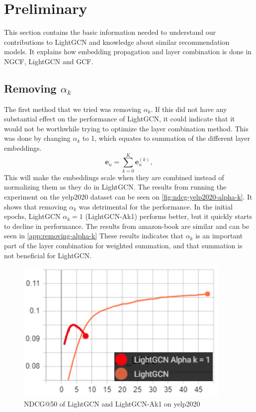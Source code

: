 \section{Preliminary}
This section contains the basic information needed to understand our contributions to LightGCN and knowledge about similar recommendation models.
It explains how embedding propagation and layer combination is done in NGCF, LightGCN and GCF.


\subsection{Removing $\alpha_k$}
The first method that we tried was removing $\alpha_k$.
If this did not have any substantial effect on the performance of LightGCN, it could indicate that it would not be worthwhile trying to optimize the layer combination method.
This was done by changing $\alpha_k$ to 1, which equates to summation of the different layer embeddings.
\begin{equation}
    \mathbf{e}_u = \sum_{k=0}^{K} \mathbf{e}_u^{(k)},
    \label{eq:removing-alpha-k-lightgcn-sum}
\end{equation}
This will make the embeddings scale when they are combined instead of normalizing them as they do in LightGCN.
The results from running the experiment on the yelp2020 dataset can be seen on \autoref{fig:ndcg-yelp2020-alpha-k}.
It shows that removing $\alpha_k$ was detrimental for the performance.
In the initial epochs, LightGCN $\alpha_k = 1$ (LightGCN-Ak1) performs better, but it quickly starts to decline in performance.
The results from amazon-book are similar and can be seen in \autoref{app:removing-alpha-k}
These results indicates that $\alpha_k$ is an important part of the layer combination for weighted summation, and that summation is not beneficial for LightGCN.
\begin{figure}
    \includegraphics[width=\linewidth]{figures/alpha-k-results/yelp2020-ndcg.png}
    \caption{NDCG@50 of LightGCN and LightGCN-Ak1 on yelp2020}
    \label{fig:ndcg-yelp2020-alpha-k}
\end{figure}